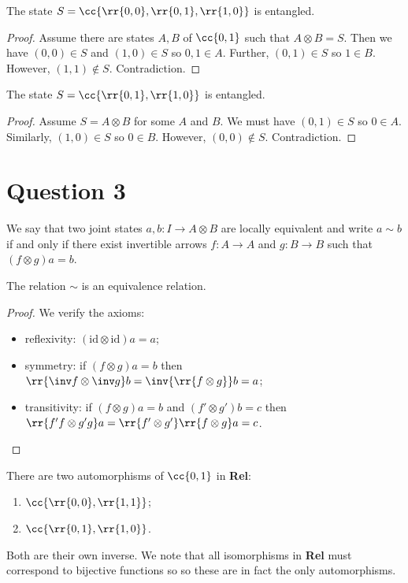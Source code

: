 \documentclass{article}
\begin{document}
\begin{claim*}
  The state $S=\cc{\rr{0,0},\rr{0,1},\rr{1,0}}$ is entangled.
  \begin{proof}
    Assume there are states $A,B$ of $\cc{0,1}$ such that $A\otimes B=S$.
    Then we have $(0,0)\in S$ and $(1,0)\in S$ so $0,1\in A$. Further,
    $(0,1)\in S$ so $1\in B$. However, $(1,1)\not\in S$. Contradiction.
  \end{proof}
\end{claim*}

\begin{claim*}
  The state $S=\cc{\rr{0,1},\rr{1,0}}$ is entangled.
  \begin{proof}
    Assume $S=A\otimes B$ for some $A$ and $B$. We must have $(0,1)\in S$ so
    $0\in A$. Similarly, $(1,0)\in S$ so $0\in B$. However, $(0,0)\not\in S$.
    Contradiction.
  \end{proof}
\end{claim*}

\section*{Question 3}

We say that two joint states $a,b:I\to A\otimes B$ are locally equivalent and write $a\sim b$
if and only if there exist invertible arrows $f:A\to A$ and $g:B\to B$ such that
$(f\otimes g)a = b$.

\begin{claim*}[a]
  The relation $\sim$ is an equivalence relation.
  \begin{proof}
    We verify the axioms:
    \begin{itemize}
      \item reflexivity: $(\text{id}\otimes\text{id})a=a$;
      \item symmetry: if $(f\otimes g)a=b$ then $\rr{\inv f\otimes\inv g}b=\inv{\rr{f\otimes g}}b=a$;
      \item transitivity: if $(f\otimes g)a=b$ and $(f'\otimes g')b=c$ then $\rr{f'f\otimes g'g}a=\rr{f'\otimes g'}\rr{f\otimes g}a=c$.
    \end{itemize}
  \end{proof}
\end{claim*}

\begin{answer*}[b]
  There are two automorphisms of $\cc{0,1}$ in \textbf{Rel}:
  \begin{enumerate}
    \item $\cc{\rr{0,0},\rr{1,1}}$;
    \item $\cc{\rr{0,1},\rr{1,0}}$.
  \end{enumerate}
  Both are their own inverse. We note that all isomorphisms in \textbf{Rel} must correspond to
  bijective functions so so these are in fact the only automorphisms.
\end{answer*}
\end{document}
